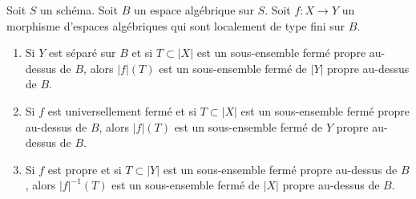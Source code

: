 \begin{lemma}
\label{lemma-functoriality-closed-proper-over-base}
Soit $S$ un schéma. Soit $B$ un espace algébrique sur $S$.
Soit $f : X \to Y$ un morphisme d'espaces algébriques qui
sont localement de type fini sur $B$.
\begin{enumerate}
\item Si $Y$ est séparé sur $B$ et si $T \subset |X|$ est un sous-ensemble fermé
propre au-dessus de $B$, alors $|f|(T)$ est un sous-ensemble fermé de $|Y|$ propre au-dessus de $B$.
\item Si $f$ est universellement fermé et si $T \subset |X|$ est un
sous-ensemble fermé propre au-dessus de $B$, alors $|f|(T)$ est un sous-ensemble fermé
de $Y$ propre au-dessus de $B$.
\item Si $f$ est propre et si $T \subset |Y|$ est un sous-ensemble fermé
propre au-dessus de $B$, alors $|f|^{-1}(T)$ est un sous-ensemble fermé de $|X|$
propre au-dessus de $B$.
\end{enumerate}
\end{lemma}

